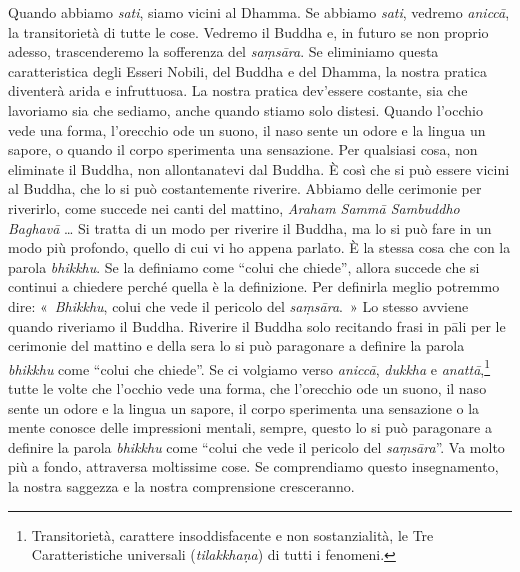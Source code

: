 Quando abbiamo \emph{sati}, siamo vicini al Dhamma. Se abbiamo
\emph{sati}, vedremo \emph{aniccā}, la transitorietà di tutte le cose.
Vedremo il Buddha e, in futuro se non proprio adesso, trascenderemo la
sofferenza del \emph{saṃsāra}. Se eliminiamo questa caratteristica degli
Esseri Nobili, del Buddha e del Dhamma, la nostra pratica diventerà
arida e infruttuosa. La nostra pratica dev'essere costante, sia che
lavoriamo sia che sediamo, anche quando stiamo solo distesi. Quando
l'occhio vede una forma, l'orecchio ode un suono, il naso sente un odore
e la lingua un sapore, o quando il corpo sperimenta una sensazione. Per
qualsiasi cosa, non eliminate il Buddha, non allontanatevi dal Buddha. È
così che si può essere vicini al Buddha, che lo si può costantemente
riverire. Abbiamo delle cerimonie per riverirlo, come succede nei canti
del mattino, \emph{Araham Sammā Sambuddho Baghavā} \ldots{} Si tratta di un
modo per riverire il Buddha, ma lo si può fare in un modo più profondo,
quello di cui vi ho appena parlato. È la stessa cosa che con la parola
\emph{bhikkhu}. Se la definiamo come ``colui che chiede'', allora
succede che si continui a chiedere perché quella è la definizione. Per
definirla meglio potremmo dire: «~\emph{Bhikkhu}, colui che vede il
pericolo del \emph{saṃsāra}.~» Lo stesso avviene quando riveriamo il
Buddha. Riverire il Buddha solo recitando frasi in pāli per le cerimonie
del mattino e della sera lo si può paragonare a definire la parola
\emph{bhikkhu} come ``colui che chiede''. Se ci volgiamo verso
\emph{aniccā}, \emph{dukkha} e \emph{anattā},\footnote{Transitorietà,
  carattere insoddisfacente e non sostanzialità, le Tre Caratteristiche
  universali (\emph{tilakkhaṇa}) di tutti i fenomeni.} tutte le volte
che l'occhio vede una forma, che l'orecchio ode un suono, il naso sente
un odore e la lingua un sapore, il corpo sperimenta una sensazione o la
mente conosce delle impressioni mentali, sempre, questo lo si può
paragonare a definire la parola \emph{bhikkhu} come ``colui che vede il
pericolo del \emph{saṃsāra}''. Va molto più a fondo, attraversa
moltissime cose. Se comprendiamo questo insegnamento, la nostra saggezza
e la nostra comprensione cresceranno.

